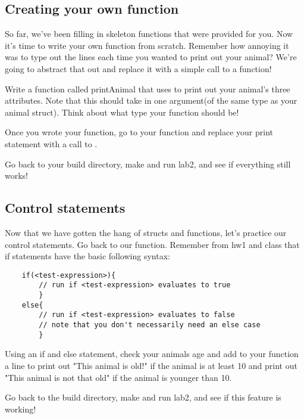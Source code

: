 \documentclass{tufte-handout}
\begin{document}
\subsection{Creating your own function}
So far, we've been filling in skeleton functions that were provided for you. Now it's time to write your own function from scratch.  Remember how annoying it was to type out the  lines each time you wanted to print out your animal?  We're going to abstract that out and replace it with a simple call to a function! 

Write a function called printAnimal that uses  to print out your animal's three attributes.  Note that this should take in one argument(of the same type as your animal struct).  Think about what type your function should be!  

Once you wrote your function, go to your  function and replace your print statement with a call to .  

Go back to your build directory, make and run lab2, and see if everything still works!  

\subsection{Control statements}

Now that we have gotten the hang of structs and functions, let's practice our control statements.  Go back to our  function.  Remember from hw1 and class that if statements have the basic following syntax:
\begin{verbatim}
    if(<test-expression>){
        // run if <test-expression> evaluates to true
        }
    else{
        // run if <test-expression> evaluates to false
        // note that you don't necessarily need an else case
        }
\end{verbatim}

Using an if and else statement, check your animals age and add to your  function a line to print out "This animal is old!" if the animal is at least 10 and print out "This animal is not that old" if the animal is younger than 10.   

Go back to the build directory, make and run lab2, and see if this feature is working!  
\end{document}
